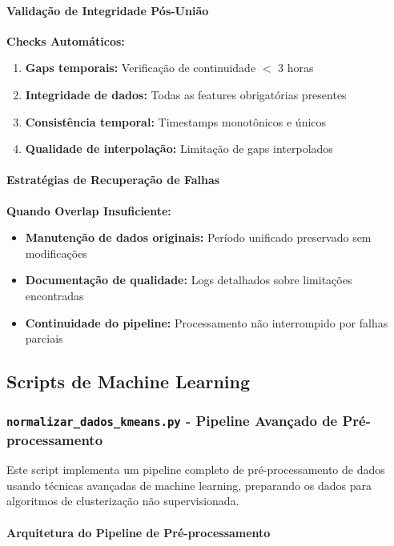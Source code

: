 \paragraph{Validação de Integridade Pós-União}

\textbf{Checks Automáticos:}
\begin{enumerate}
    \item \textbf{Gaps temporais:} Verificação de continuidade $<$ 3 horas
    \item \textbf{Integridade de dados:} Todas as features obrigatórias presentes
    \item \textbf{Consistência temporal:} Timestamps monotônicos e únicos
    \item \textbf{Qualidade de interpolação:} Limitação de gaps interpolados
\end{enumerate}

\paragraph{Estratégias de Recuperação de Falhas}

\textbf{Quando Overlap Insuficiente:}
\begin{itemize}
    \item \textbf{Manutenção de dados originais:} Período unificado preservado sem modificações
    \item \textbf{Documentação de qualidade:} Logs detalhados sobre limitações encontradas
    \item \textbf{Continuidade do pipeline:} Processamento não interrompido por falhas parciais
\end{itemize}

\subsection{Scripts de Machine Learning}

\subsubsection{\texttt{normalizar\_dados\_kmeans.py} - Pipeline Avançado de Pré-processamento}

Este script implementa um pipeline completo de pré-processamento de dados usando técnicas avançadas de machine learning, preparando os dados para algoritmos de clusterização não supervisionada.

\paragraph{Arquitetura do Pipeline de Pré-processamento}

